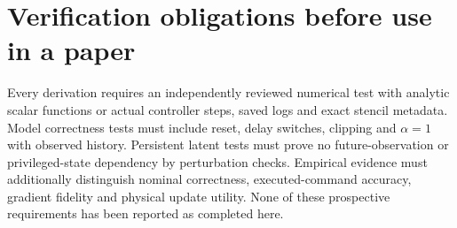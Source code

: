 \documentclass[10pt]{article}
\begin{document}
\section{Verification obligations before use in a paper}
Every derivation requires an independently reviewed numerical test with analytic scalar functions or actual controller steps, saved logs and exact stencil metadata. Model correctness tests must include reset, delay switches, clipping and $\alpha=1$ with observed history. Persistent latent tests must prove no future-observation or privileged-state dependency by perturbation checks. Empirical evidence must additionally distinguish nominal correctness, executed-command accuracy, gradient fidelity and physical update utility. None of these prospective requirements has been reported as completed here.
\end{document}
